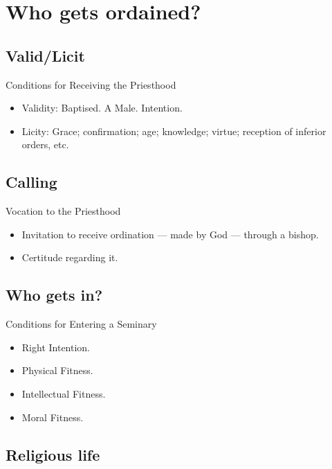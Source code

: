\documentclass{beamer}
\begin{document}
\section{Who gets ordained?}

\subsection{Valid/Licit}

\begin{frame}{Conditions for Receiving the Priesthood}
\begin{itemize}
 \item    Validity: Baptised. A Male. Intention.
 \item    Licity: Grace; confirmation; age; knowledge; virtue; reception  of inferior orders, etc.
\end{itemize}
\end{frame}

\subsection{Calling}

\begin{frame}{Vocation to the Priesthood}
\begin{itemize}
 \item Invitation to receive ordination --- made by God --- through a bishop.
 \item Certitude regarding it.
\end{itemize}
\end{frame}

\subsection{Who gets in?}

\begin{frame}{Conditions for Entering a Seminary}
\begin{itemize}
 \item Right Intention.
 \item Physical Fitness.
 \item Intellectual Fitness.
 \item Moral Fitness.
\end{itemize}
\end{frame}

\subsection{Religious life}
\end{document}

